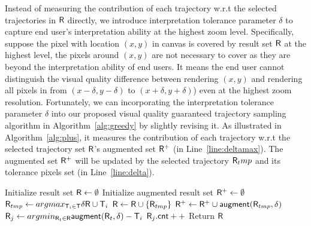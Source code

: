 Instead of measuring the contribution of each trajectory w.r.t the selected trajectories in $\mathsf{R}$ directly,
we introduce interpretation tolerance parameter $\delta$ to capture end user's interpretation ability at the highest zoom level.
Specifically, suppose the pixel with location $(x,y)$ in canvas is covered by result set $\mathsf{R}$ at the highest level,
the pixels around $(x,y)$ are not necessary to cover as they are beyond the interpretation ability of end users.
It means the end user cannot distinguish the visual quality difference between rendering $(x,y)$ and rendering all pixels in from $(x-\delta, y-\delta)$ to $(x+\delta, y+\delta)$) even at the highest zoom resolution.
Fortunately, we can incorporating the interpretation tolerance parameter $\delta$ into our proposed visual quality guaranteed trajectory sampling algorithm in Algorithm~\ref{alg:greedy}
by slightly revising it.
As illustrated in Algorithm~\ref{alg:plus}, it measures the contribution of each trajectory w.r.t the selected trajectory set $\mathsf{R}$'s augmented set $\mathsf{R}^{+}$ (in Line~\ref{line:deltamax}).
The augmented set $\mathsf{R}^{+}$ will be updated by the selected trajectory $\mathsf{R}_tmp$ and its tolerance pixels set (in Line~\ref{line:delta}).


\begin{algorithm}
    \caption{$\avats(\D,k,\delta)$} \label{alg:plus}
    \begin{algorithmic}[1]
    \State Initialize result set $\mathsf{R} \leftarrow \emptyset$
    \State Initialize augmented result set $\mathsf{R}^{+} \leftarrow \emptyset$
        \State $\mathsf{R}_{tmp} \leftarrow argmax_{\mathsf{T}_i \in \mathsf{T}} \delta\mathsf{R} \cup \mathsf{T}_i$ \label{line:deltamax}
        \State $\mathsf{R} \leftarrow \mathsf{R} \cup \{ \mathsf{R}_{tmp} \}$
        \State $\mathsf{R}^{+} \leftarrow \mathsf{R}^{+} \cup \mathsf{augment}(\mathsf{R}_{tmp}, \delta)$\label{line:delta}
    \EndWhile
      \label{line:s}
        \State $\mathsf{R}_j \leftarrow argmin_{\mathsf{R}_{t} \in \mathsf{R}}{\mathsf{augment}(\mathsf{R}_{t}, \delta) - \mathsf{T}_i}$
        \State $\mathsf{R}_j.\mathsf{cnt}++$ \label{line:e}
    \EndFor
    \State Return $\mathsf{R}$
    \end{algorithmic}
\end{algorithm}

